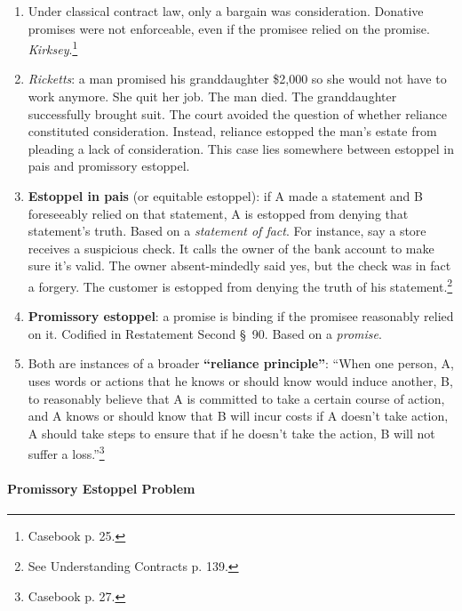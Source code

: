 \begin{enumerate}
    \item Under classical contract law, only a bargain was consideration. 
    Donative promises were not enforceable, even if the promisee relied on the 
    promise. \emph{Kirksey}.\footnote{Casebook p. 25.}
    \item \emph{Ricketts}: a man promised his granddaughter \$2,000 so she 
    would not have to work anymore. She quit her job. The man died. The 
    granddaughter successfully brought suit. The court avoided the question of 
    whether reliance constituted consideration. Instead, reliance estopped the 
    man's estate from pleading a lack of consideration. This case lies 
    somewhere between estoppel in pais and promissory estoppel.
    \item \textbf{Estoppel in pais} (or equitable estoppel): if A made a 
    statement and B foreseeably relied on that statement, A is estopped from 
    denying that statement's truth. Based on a \emph{statement of fact}. For 
    instance, say a store receives a suspicious check. It calls the owner of 
    the bank account to make sure it's valid. The owner absent-mindedly said 
    yes, but the check was in fact a forgery. The customer is estopped from 
    denying the truth of his statement.\footnote{See Understanding Contracts 
    p. 139.}
    \item \textbf{Promissory estoppel}: a promise is binding if the promisee 
    reasonably relied on it. Codified in Restatement Second \S\ 90. Based on a 
    \emph{promise}.
    \item Both are instances of a broader \textbf{``reliance principle''}: 
    ``When one person, A, uses words or actions that he knows or should know 
    would induce another, B, to reasonably believe that A is committed to take 
    a certain course of action, and A knows or should know that B will incur 
    costs if A doesn't take action, A should take steps to ensure that if he 
    doesn't take the action, B will not suffer a loss.''\footnote{Casebook p. 
    27.}
\end{enumerate}

\paragraph{Promissory Estoppel Problem}

